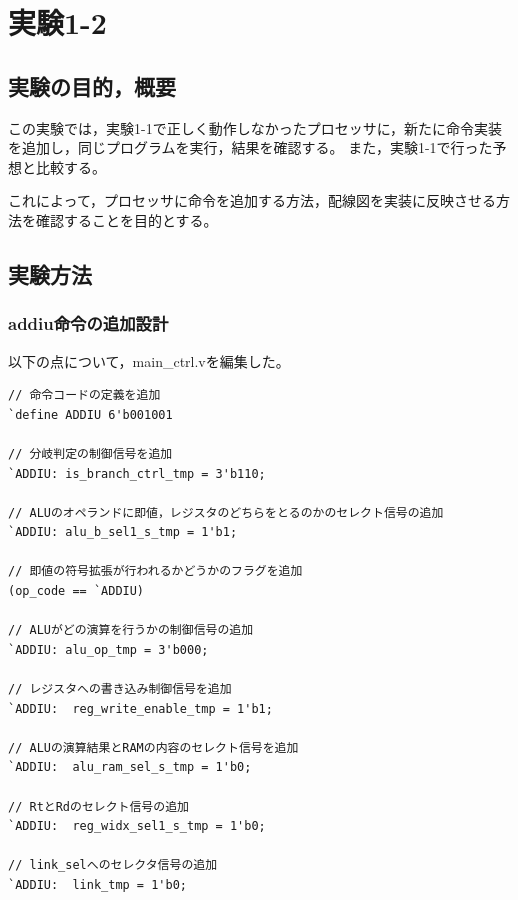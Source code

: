 \section{実験1-2}
\subsection{実験の目的，概要}
この実験では，実験1-1で正しく動作しなかったプロセッサに，新たに命令実装を追加し，同じプログラムを実行，結果を確認する。
また，実験1-1で行った予想と比較する。

これによって，プロセッサに命令を追加する方法，配線図を実装に反映させる方法を確認することを目的とする。

\subsection{実験方法}
\subsubsection{addiu命令の追加設計}
以下の点について，main\_ctrl.vを編集した。
\begin{lstlisting}[caption={addiu命令の追加設計},label={addiu命令の追加設計}]
// 命令コードの定義を追加
`define ADDIU 6'b001001

// 分岐判定の制御信号を追加
`ADDIU: is_branch_ctrl_tmp = 3'b110;

// ALUのオペランドに即値，レジスタのどちらをとるのかのセレクト信号の追加
`ADDIU: alu_b_sel1_s_tmp = 1'b1;

// 即値の符号拡張が行われるかどうかのフラグを追加
(op_code == `ADDIU)

// ALUがどの演算を行うかの制御信号の追加
`ADDIU: alu_op_tmp = 3'b000;

// レジスタへの書き込み制御信号を追加
`ADDIU:  reg_write_enable_tmp = 1'b1;

// ALUの演算結果とRAMの内容のセレクト信号を追加
`ADDIU:  alu_ram_sel_s_tmp = 1'b0;

// RtとRdのセレクト信号の追加
`ADDIU:  reg_widx_sel1_s_tmp = 1'b0;

// link_selへのセレクタ信号の追加
`ADDIU:  link_tmp = 1'b0;

\end{lstlisting}

